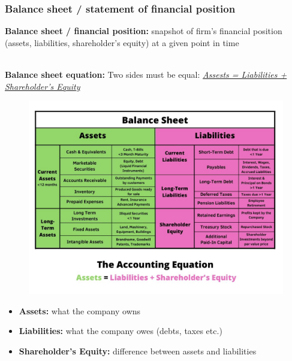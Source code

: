 \documentclass[ieeetran]{article}
\begin{document}
\subsubsection{Balance sheet / statement of financial position} %
\label{ssub:balance_sheet_statement_of_financial_position}

\textbf{Balance sheet / financial position:} snapshot of firm's financial position (assets, liabilities, shareholder's equity) at a given point in time

\textbf{\\Balance sheet equation:} Two sides must be equal: 
\underline{\textit{Assests = Liabilities + Shareholder's Equity}}

\begin{figure}[t]
  \centering
  \includegraphics[width=0.58\linewidth]{balancesheet.jpg}
  \label{fig:balance_sheet_figure}
\end{figure}

\pagebreak

\begin{itemize}
  \item \textbf{Assets:} what the company owns
  \item \textbf{Liabilities:} what the company owes (debts, taxes etc.)
  \item \textbf{Shareholder's Equity:} difference between assets and liabilities
\end{itemize}
\end{document}

